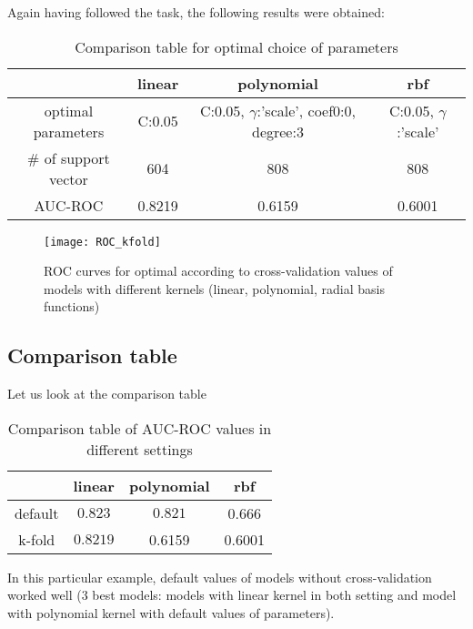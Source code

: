 \documentclass{article}
\begin{document}
Again having followed the task, the following results were obtained:
\newpage 

\begin{table}[h!]
\centering
\begin{tabular}{|c|c|c|c|}
\hline
 & linear & polynomial & rbf \\
\hline
optimal parameters & {C:0.05} & {C:0.05, $\gamma$:'scale', coef0:0, degree:3} & {C:0.05, $\gamma$:'scale'}\\
\hline
\# of support vector & 604 & 808 & 808 \\
\hline
AUC-ROC & 0.8219 & 0.6159 & 0.6001\\
\hline	
\end{tabular}
\caption{Comparison table for optimal choice of parameters}
\end{table}

\begin{figure*}[h!]
\texttt{[image: ROC\_kfold]}
\caption{ROC curves for optimal according to cross-validation values of models with different kernels (linear, polynomial, radial basis functions) }
\end{figure*}

\subsection{Comparison table}

Let us look at the comparison table

\begin{table}[h!]
\centering
\begin{tabular}{|c|c|c|c|}
\hline
 & linear & polynomial & rbf \\
\hline
default & $\mathbf{0.823}$ & $\mathbf{0.821}$ & 0.666 \\
\hline
k-fold & $\mathbf{0.8219}$ & 0.6159 & 0.6001\\
\hline	
\end{tabular}
\caption{Comparison table of AUC-ROC values in different settings}
\end{table}

In this particular example, default values of models without cross-validation worked well (3 best models: models with linear kernel in both setting and model with polynomial kernel with default values of parameters).
\end{document}
